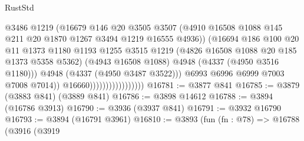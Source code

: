 \begin{lexlean}{RustStd}
\begin{coremodule}
                                            @3486
                                            @1219
                                            (@16679
                                              @146
                                              @20
                                              @3505
                                              @3507
                                              (@4910
                                                @16508
                                                @1088
                                                @145
                                                @211
                                                @20
                                                @1870
                                                @1267
                                                @3494
                                                @1219
                                                @16555
                                                @4936))
                                            (@16694
                                              @186
                                              @100
                                              @20
                                              @11
                                              @1373
                                              @1180
                                              @1193
                                              @1255
                                              @3515
                                              @1219
                                              (@4826 @16508 @1088 @20 @185 @1373 @5358 @5362)
                                              (@4943 @16508 @1088)
                                              @4948
                                              (@4337 (@4950 @3516 @1180)))
                                            @4948
                                            (@4337 (@4950 @3487 @3522)))
                                          @6993
                                          @6996
                                          @6999
                                          @7003
                                          @7008
                                          @7014))
                                      @16660)))))))))))))))))
@16781 := @3877 @841
@16785 := @3879 (@3883 @841) (@3889 @841)
@16786 := @3898 @14612
@16788 := @3894 (@16786 @3913)
@16790 := @3936 (@3937 @841)
@16791 := @3932 @16790
@16793 := @3894 (@16791 @3961)
@16810 := @3893
    (fun (fn : @78) =>
    @16788
      (@3916
        (@3919

\end{coremodule}
\end{lexlean}
